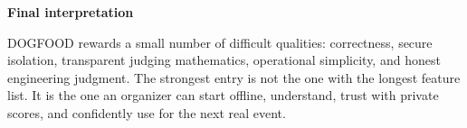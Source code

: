 \documentclass[11pt]{article}
\begin{document}
\vfill
\begin{tcolorbox}[colback=Navy,colframe=Navy,arc=2mm,left=6mm,right=6mm,top=6mm,bottom=6mm]
\color{white}
{\Large\bfseries Final interpretation}\par
\vspace{2mm}
DOGFOOD rewards a small number of difficult qualities: correctness, secure isolation, transparent judging mathematics, operational simplicity, and honest engineering judgment. The strongest entry is not the one with the longest feature list. It is the one an organizer can start offline, understand, trust with private scores, and confidently use for the next real event.
\end{tcolorbox}


\end{document}
